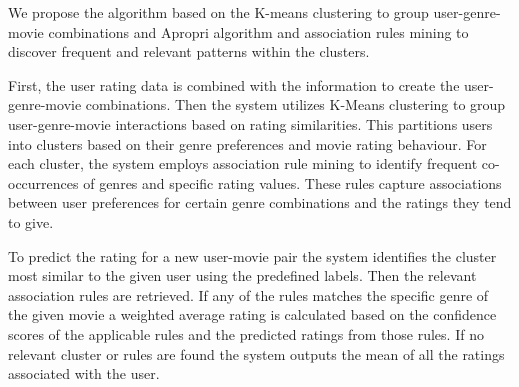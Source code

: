 We propose the algorithm based on the K-means clustering to group user-genre-movie combinations and Apropri algorithm and association rules mining to discover frequent and relevant patterns within the clusters.

First, the user rating data is combined with the information to create the user-genre-movie combinations. Then the system utilizes K-Means clustering to group user-genre-movie interactions based on rating similarities. This partitions users into clusters based on their genre preferences and movie rating behaviour. For each cluster, the system employs association rule mining to identify frequent co-occurrences of genres and specific rating values. These rules capture associations between user preferences for certain genre combinations and the ratings they tend to give.

To predict the rating for a new user-movie pair the system identifies the cluster most similar to the given user using the predefined labels. Then the relevant association rules are retrieved. If any of the rules matches the specific genre of the given movie a weighted average rating is calculated based on the confidence scores of the applicable rules and the predicted ratings from those rules. If no relevant cluster or rules are found the system outputs the mean of all the ratings associated with the user.